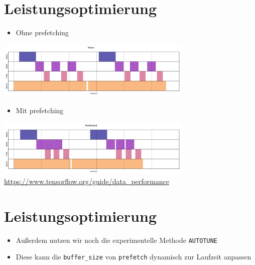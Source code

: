 \documentclass[t]{beamer}
\newcommand\pycode[1]{\inputminted[frame=lines, framesep=2mm, fontsize=\normalsize]{python}{#1}}
\begin{document}
\section{Leistungsoptimierung}
\begin{frame}
    \begin{itemize}
        \item Ohne prefetching
    \end{itemize}
    \includegraphics[width=0.7\textwidth]{teach-plots/naive-prefetching-crop.pdf}
    \begin{itemize}
        \item Mit prefetching
    \end{itemize}
    \includegraphics[width=0.7\textwidth]{teach-plots/prefetched-crop.pdf}
    \large\href{https://www.tensorflow.org/guide/data_performance}{https://www.tensorflow.org/guide/data\_performance}
\end{frame}

\section{Leistungsoptimierung}
\begin{frame}
    \begin{itemize}
        \item Außerdem nutzen wir noch die experimentelle Methode \texttt{AUTOTUNE}
        \item Diese kann die \texttt{buffer\_size} von \texttt{prefetch} dynamisch zur Laufzeit anpassen
        \pycode{./code-snippets/dataset-optimize.py}
    \end{itemize}
\end{frame}
\end{document}

